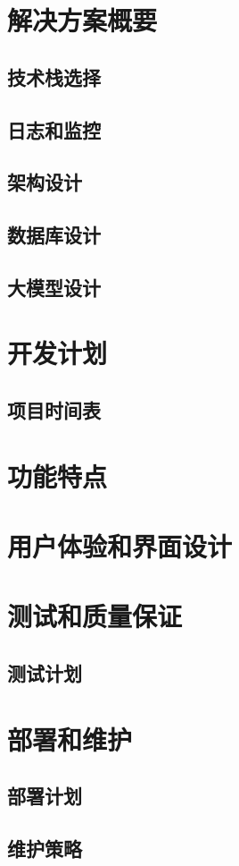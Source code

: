 \documentclass{article}
\begin{document}
\section{解决方案概要}
\subsection{技术栈选择}
\subsection{日志和监控}
\subsection{架构设计}
\subsection{数据库设计}
\subsection{大模型设计}
\section{开发计划}
\subsection{项目时间表}
\section{功能特点}
\section{用户体验和界面设计}
\section{测试和质量保证}
\subsection{测试计划}
\section{部署和维护}
\subsection{部署计划}
\subsection{维护策略}
\end{document}
